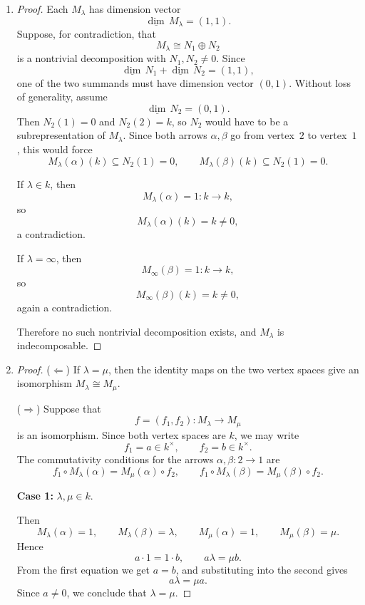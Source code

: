 \documentclass[12pt]{amsart}
\begin{document}
\begin{enumerate}
\medskip

\begin{enumerate}[label=(\alph*)]
    \item
    \begin{proof}
    Each $M_\lambda$ has dimension vector
    \[
    \underline{\dim}\,M_\lambda=(1,1).
    \]
    Suppose, for contradiction, that
    \[
    M_\lambda \cong N_1 \oplus N_2
    \]
    is a nontrivial decomposition with $N_1,N_2\neq 0$. Since
    \[
    \underline{\dim}\,N_1+\underline{\dim}\,N_2=(1,1),
    \]
    one of the two summands must have dimension vector $(0,1)$. Without loss of
    generality, assume
    \[
    \underline{\dim}\,N_2=(0,1).
    \]
    Then $N_2(1)=0$ and $N_2(2)=k$, so $N_2$ would have to be a subrepresentation of
    $M_\lambda$. Since both arrows $\alpha,\beta$ go from vertex~$2$ to vertex~$1$,
    this would force
    \[
    M_\lambda(\alpha)(k)\subseteq N_2(1)=0,
    \qquad
    M_\lambda(\beta)(k)\subseteq N_2(1)=0.
    \]

    If $\lambda\in k$, then
    \[
    M_\lambda(\alpha)=1\colon k\to k,
    \]
    so
    \[
    M_\lambda(\alpha)(k)=k\neq 0,
    \]
    a contradiction.

    If $\lambda=\infty$, then
    \[
    M_\infty(\beta)=1\colon k\to k,
    \]
    so
    \[
    M_\infty(\beta)(k)=k\neq 0,
    \]
    again a contradiction.

    Therefore no such nontrivial decomposition exists, and $M_\lambda$ is
    indecomposable.
    \end{proof}

    \item
    \begin{proof}
    ($\Leftarrow$) If $\lambda=\mu$, then the identity maps on the two vertex spaces
    give an isomorphism $M_\lambda\cong M_\mu$.

    \medskip
    ($\Rightarrow$) Suppose that
    \[
    f=(f_1,f_2)\colon M_\lambda\to M_\mu
    \]
    is an isomorphism. Since both vertex spaces are $k$, we may write
    \[
    f_1=a\in k^\times,\qquad f_2=b\in k^\times.
    \]
    The commutativity conditions for the arrows $\alpha,\beta\colon 2\to 1$ are
    \[
    f_1\circ M_\lambda(\alpha)=M_\mu(\alpha)\circ f_2,
    \qquad
    f_1\circ M_\lambda(\beta)=M_\mu(\beta)\circ f_2.
    \]

    \textbf{Case 1:} $\lambda,\mu\in k$.

    Then
    \[
    M_\lambda(\alpha)=1,\qquad M_\lambda(\beta)=\lambda,
    \qquad
    M_\mu(\alpha)=1,\qquad M_\mu(\beta)=\mu.
    \]
    Hence
    \[
    a\cdot 1 = 1\cdot b,\qquad a\lambda=\mu b.
    \]
    From the first equation we get $a=b$, and substituting into the second gives
    \[
    a\lambda=\mu a.
    \]
    Since $a\neq 0$, we conclude that $\lambda=\mu$.


\end{proof}
\end{enumerate}
\end{enumerate}
\end{document}
